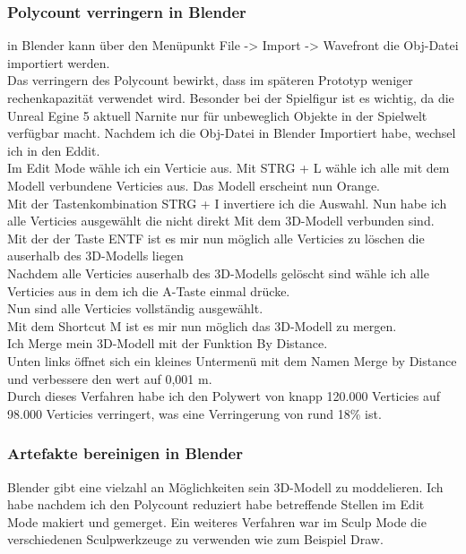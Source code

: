 \documentclass[10pt,a4paper,bibliography=totocnumbered,listof=totocnumbered]{scrartcl}
\begin{document}
\subsubsection{Polycount verringern in Blender}
in Blender kann über den Menüpunkt File -> Import -> Wavefront die Obj-Datei importiert werden. 
\\
Das verringern des Polycount bewirkt, dass im späteren Prototyp weniger rechenkapazität verwendet wird. Besonder bei der Spielfigur ist es wichtig, da die Unreal Egine 5 aktuell Narnite nur für unbeweglich Objekte in der Spielwelt verfügbar macht.
Nachdem ich die Obj-Datei in Blender Importiert habe, wechsel ich in den Eddit.
\\
Im Edit Mode wähle ich ein Verticie aus. Mit STRG + L wähle ich alle mit dem Modell verbundene Verticies aus. Das Modell erscheint nun Orange.
\\
Mit der Tastenkombination STRG + I invertiere ich die Auswahl. Nun habe ich alle Verticies ausgewählt die nicht direkt Mit dem 3D-Modell verbunden sind.
\\
Mit der der Taste ENTF ist es mir nun möglich alle Verticies zu löschen die auserhalb des 3D-Modells liegen
\\
Nachdem alle Verticies auserhalb des 3D-Modells gelöscht sind wähle ich alle Verticies aus in dem ich die A-Taste einmal drücke.
\\
Nun sind alle Verticies vollständig ausgewählt.
\\
Mit dem Shortcut M ist es mir nun möglich das 3D-Modell zu mergen.
\\
Ich Merge mein 3D-Modell mit der Funktion By Distance.
\\
Unten links öffnet sich ein kleines Untermenü mit dem Namen Merge by Distance und verbessere den wert auf 0,001 m.
\\
Durch dieses Verfahren habe ich den Polywert von knapp 120.000 Verticies auf 98.000 Verticies verringert, was eine Verringerung von rund 18\% ist.
\subsubsection{Artefakte bereinigen in Blender}
Blender gibt eine vielzahl an Möglichkeiten sein 3D-Modell zu moddelieren. Ich habe nachdem ich den Polycount reduziert habe betreffende Stellen im Edit Mode makiert und gemerget. Ein weiteres Verfahren war im Sculp Mode die verschiedenen Sculpwerkzeuge zu verwenden wie zum Beispiel Draw.
\end{document}
